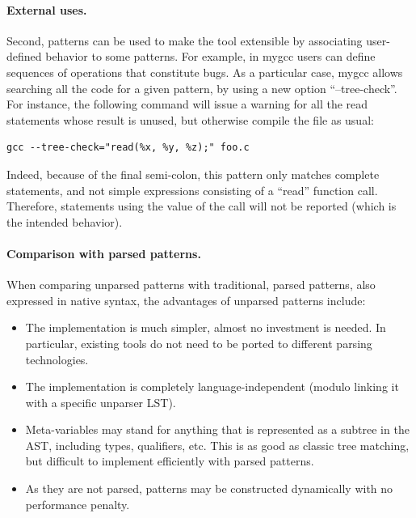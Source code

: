\documentclass{sigplanconf}
\begin{document}
\paragraph{External uses.}
Second, patterns can be used to make the tool extensible by
associating user-defined behavior to some patterns. For example, in
mygcc users can define sequences of operations that constitute
bugs. As a particular case, mygcc allows searching all the code for a
given pattern, by using a new option ``--tree-check''. For instance,
the following command will issue a warning for all the read statements
whose result is unused, but otherwise compile the file as usual:
\begin{verbatim}
gcc --tree-check="read(%x, %y, %z);" foo.c   
\end{verbatim}
Indeed, because of the final semi-colon, this pattern only matches
complete statements, and not simple expressions consisting of a
``read'' function call. Therefore, statements using the value of the
call will not be reported (which is the intended behavior).

\paragraph{Comparison with parsed patterns.}
When comparing unparsed patterns with traditional, parsed patterns,
also expressed in native syntax, the advantages of unparsed patterns
include:
\begin{itemize}
\item The implementation is much simpler, almost no investment
is needed. In particular, existing tools do not need to be
ported to different parsing technologies.
\item The implementation is completely language-independent (modulo
linking it with a specific unparser LST).
\item Meta-variables may stand for anything that is represented as a
subtree in the AST, including types, qualifiers, etc. This is as good
as classic tree matching, but difficult to implement efficiently with
parsed patterns.
\item As they are not parsed, patterns may be constructed dynamically
with no performance penalty. 
\end{itemize}
\end{document}

